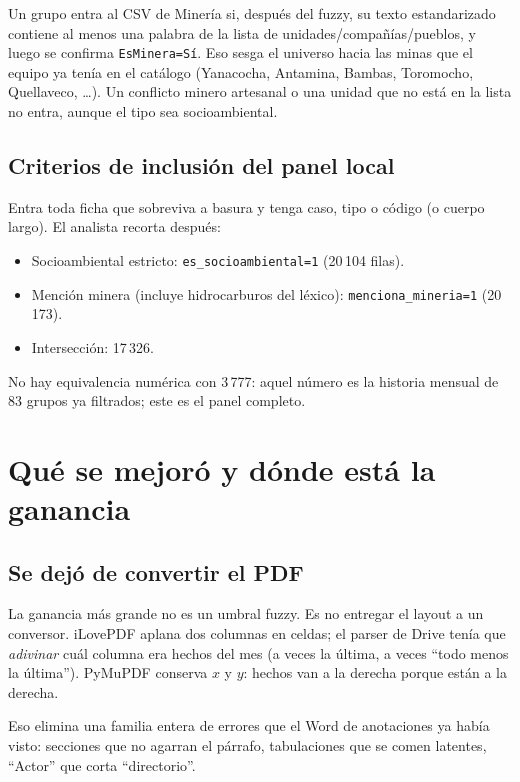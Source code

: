 \documentclass[11pt,a4paper]{article}
\begin{document}
Un grupo entra al CSV de Minería si, después del fuzzy, su texto estandarizado contiene al menos una palabra de la lista de unidades/compañías/pueblos, y luego se confirma \texttt{EsMinera=Sí}. Eso sesga el universo hacia las minas que el equipo ya tenía en el catálogo (Yanacocha, Antamina, Bambas, Toromocho, Quellaveco, \ldots). Un conflicto minero artesanal o una unidad que no está en la lista no entra, aunque el tipo sea socioambiental.

\subsection{Criterios de inclusión del panel local}

Entra toda ficha que sobreviva a basura y tenga caso, tipo o código (o cuerpo largo). El analista recorta después:

\begin{itemize}
  \item Socioambiental estricto: \texttt{es\_socioambiental=1} (20\,104 filas).
  \item Mención minera (incluye hidrocarburos del léxico): \texttt{menciona\_mineria=1} (20\,173).
  \item Intersección: 17\,326.
\end{itemize}

No hay equivalencia numérica con 3\,777: aquel número es la historia mensual de 83 grupos ya filtrados; este es el panel completo.

\section{Qué se mejoró y dónde está la ganancia}

\subsection{Se dejó de convertir el PDF}

La ganancia más grande no es un umbral fuzzy. Es no entregar el layout a un conversor. iLovePDF aplana dos columnas en celdas; el parser de Drive tenía que \emph{adivinar} cuál columna era hechos del mes (a veces la última, a veces ``todo menos la última''). PyMuPDF conserva $x$ y $y$: hechos van a la derecha porque están a la derecha.

Eso elimina una familia entera de errores que el Word de anotaciones ya había visto: secciones que no agarran el párrafo, tabulaciones que se comen latentes, ``Actor'' que corta ``directorio''.
\end{document}
